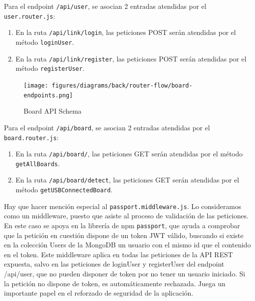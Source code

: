 \vspace{0.5cm}

Para el endpoint \verb|/api/user|, se asocian 2 entradas atendidas por el \verb|user.router.js|:
\begin{enumerate}
\item En la ruta \verb|/api/link/login|, las peticiones POST serán atendidas por el método \verb|loginUser|.
\item En la ruta \verb|/api/link/register|, las peticiones POST serán atendidas por el método \verb|registerUser|.
\end{enumerate}

\begin{figure}[hbt!]
\centering
\texttt{[image: figures/diagrams/back/router-flow/board-endpoints.png]}
\caption[board-endpoints]{Board API Schema\footnotemark}
\end{figure}

\vspace{0.5cm}

Para el endpoint \verb|/api/board|, se asocian 2 entradas atendidas por el \verb|board.router.js|:
\begin{enumerate}
\item En la ruta \verb|/api/board/|, las peticiones GET serán atendidas por el método \verb|getAllBoards|.
\item En la ruta \verb|/api/board/detect|, las peticiones GET serán atendidas por el método \verb|getUSBConnectedBoard|.
\end{enumerate}

\vspace{1cm}

Hay que hacer mención especial al \verb|passport.middleware.js|. Lo consideramos como un \gls{middleware}, puesto que asiste al proceso de validación de las peticiones. En este caso se apoya en la librería de npm \verb|passport|, que ayuda a comprobar que la petición en cuestión dispone de un token JWT válido, buscando si existe en la colección Users de la MongoDB un usuario con el mismo id que el contenido en el token. Este middleware aplica en todas las peticiones de la API REST expuesta, salvo en las peticiones de loginUser y registerUser del endpoint /api/user, que no pueden disponer de token por no tener un usuario iniciado. Si la petición no dispone de token, es automáticamente rechazada. Juega un importante papel en el reforzado de seguridad de la aplicación.

\vspace{1cm}

